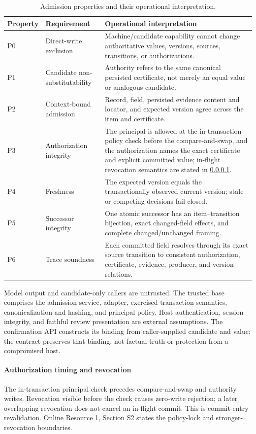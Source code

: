 \begin{table}[!htbp]
\centering
\caption{Admission properties and their operational interpretation.}
\label{tab:properties}
\begin{tabularx}{\textwidth}{@{}l>{\raggedright\arraybackslash}p{}>{\raggedright\arraybackslash}X@{}}
\toprule
Property & Requirement & Operational interpretation \\
\midrule
P0 & Direct-write exclusion & Machine/candidate capability cannot change authoritative values, versions, sources, transitions, or authorizations. \\
P1 & Candidate non-substitutability & Authority refers to the same canonical persisted certificate, not merely an equal value or analogous candidate. \\
P2 & Context-bound admission & Record, field, persisted evidence content and locator, and expected version agree across the item and certificate. \\
P3 & Authorization integrity & The principal is allowed at the in-transaction policy check before the compare-and-swap, and the authorization names the exact certificate and explicit committed value; in-flight revocation semantics are stated in \cref{sec:authorization-timing}. \\
P4 & Freshness & The expected version equals the transactionally observed current version; stale or competing decisions fail closed. \\
P5 & Successor integrity & One atomic successor has an item--transition bijection, exact changed-field effects, and complete changed/unchanged framing. \\
P6 & Trace soundness & Each committed field resolves through its exact source transition to consistent authorization, certificate, evidence, producer, and version relations. \\
\bottomrule
\end{tabularx}
\end{table}


Model output and candidate-only callers are untrusted. The trusted base comprises the admission service, adapter, exercised transaction semantics, canonicalization and hashing, and principal policy. Host authentication, session integrity, and faithful review presentation are external assumptions. The confirmation API constructs its binding from caller-supplied candidate and value; the contract preserves that binding, not factual truth or protection from a compromised host.

\paragraph{Authorization timing and revocation}
\label{sec:authorization-timing}
The in-transaction principal check precedes compare-and-swap and authority writes. Revocation visible before the check causes zero-write rejection; a later overlapping revocation does not cancel an in-flight commit. This is commit-entry revalidation. Online Resource 1, Section S2 states the policy-lock and stronger-revocation boundaries.
